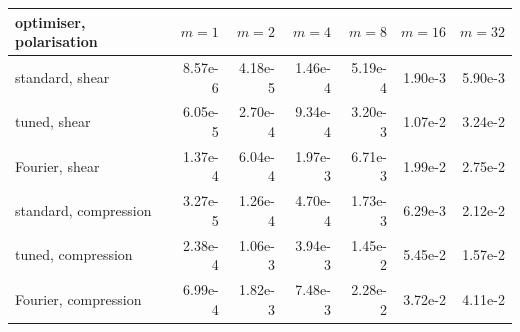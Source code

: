\begin{tabular}{lrrrrrr}\toprule
optimiser, polarisation & $m=1$ & $m=2$ & $m=4$ & $m=8$ & $m=16$ & $m=32$\\\midrule
standard, shear & 8.57e-6 & 4.18e-5 & 1.46e-4 & 5.19e-4 & 1.90e-3 & 5.90e-3\\
tuned, shear & 6.05e-5 & 2.70e-4 & 9.34e-4 & 3.20e-3 & 1.07e-2 & 3.24e-2\\
Fourier, shear & 1.37e-4 & 6.04e-4 & 1.97e-3 & 6.71e-3 & 1.99e-2 & 2.75e-2\\
standard, compression & 3.27e-5 & 1.26e-4 & 4.70e-4 & 1.73e-3 & 6.29e-3 & 2.12e-2\\
tuned, compression & 2.38e-4 & 1.06e-3 & 3.94e-3 & 1.45e-2 & 5.45e-2 & 1.57e-2\\
Fourier, compression & 6.99e-4 & 1.82e-3 & 7.48e-3 & 2.28e-2 & 3.72e-2 & 4.11e-2\\
\bottomrule\end{tabular}
